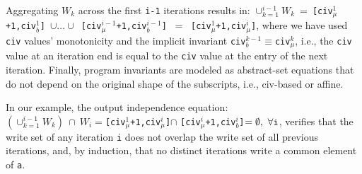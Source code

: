 \documentclass{sig-alternate}
\begin{document}
Aggregating $W_k$ across the first {\tt i-1} iterations results in:
$\cup_{k=1}^{i-1}W_k \ = \ ${\tt [civ$_\mu^1$+1,civ$_b^1$]~$\cup\ldots\cup$~[civ$_\mu^{i-1}$+1,civ$_b^{i-1}$]} $\ = \ $ {\tt [civ$_\mu^1$+1,civ$_\mu^i$]}, where we have used {\tt civ} values'
monotonicity and the implicit invariant {\tt civ$_b^{k-1}\equiv$civ$_\mu^{k}$},
i.e., the {\tt civ} value at an iteration end is equal to the {\tt civ}
value at the entry of the next iteration. 
%
%
Finally, program invariants are modeled as abstract-set equations
that do not depend on the original shape of the subscripts, i.e., 
{\sc civ}-based or affine. 

In our example, the output independence equation:\\
$(\cup_{k=1}^{i-1}W_k)~\cap~W_i = ${\tt [civ$_\mu^1$+1,civ$_\mu^i$]}$\cap$
{\tt [civ$_\mu^i$+1,civ$_b^i$]}$ = \emptyset,~\forall \mbox{\tt{}i}$,
verifies that the write set of any iteration {\tt i} does not overlap
the write set of all previous iterations, and, by induction,
that no distinct iterations write a common element of {\tt a}.



\end{document}
